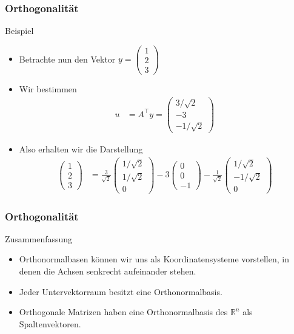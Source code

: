 \documentclass{beamer}
\newcommand\RR{\mathbb R}
\newcommand{\trans}{\top}
\renewcommand{\ae}{\"a}
\renewcommand{\oe}{\"o}
\newcommand{\mytitle}{Orthogonalit\ae t}
\begin{document}
\begin{frame}\frametitle{\mytitle}
	\begin{block}{Beispiel}
		\begin{itemize}
			\item Betrachte nun den Vektor $y=\begin{pmatrix}1\\2\\3\end{pmatrix}$
			\item Wir bestimmen 
				\begin{align*}
					u&=A^\trans y=\begin{pmatrix}
					3/\sqrt 2\\-3\\-1/\sqrt 2
					\end{pmatrix}
				\end{align*}
			\item Also erhalten wir die Darstellung
				\begin{align*}
				\begin{pmatrix}1\\2\\3\end{pmatrix}
&=\frac{3}{\sqrt 2} \begin{pmatrix}1/\sqrt 2\\1/\sqrt 2\\0\end{pmatrix}-3\begin{pmatrix}0\\0\\-1\end{pmatrix}-\frac{1}{\sqrt 2}\begin{pmatrix}1/\sqrt 2\\-1/\sqrt 2\\0\end{pmatrix}
				\end{align*}
		\end{itemize}
	\end{block}
\end{frame}

\begin{frame}\frametitle{\mytitle}
	\begin{block}{Zusammenfassung}
		\begin{itemize}
			\item Orthonormalbasen k\oe nnen wir uns als Koordinatensysteme vorstellen, in denen die Achsen senkrecht aufeinander stehen.
			\item Jeder Untervektorraum besitzt eine Orthonormalbasis.
			\item Orthogonale Matrizen haben eine Orthonormalbasis des $\RR^n$ als Spaltenvektoren.
		\end{itemize}
	\end{block}
\end{frame}
\end{document}

